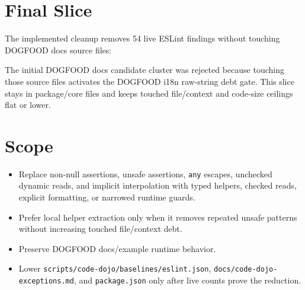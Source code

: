 \section{Final Slice}\label{record-224-final-slice}

The implemented cleanup removes 54 live ESLint findings without touching DOGFOOD docs source files:



The initial DOGFOOD docs candidate cluster was rejected because touching those source files activates the DOGFOOD i18n raw-string debt gate. This slice stays in package/core files and keeps touched file/context and code-size ceilings flat or lower.

\section{Scope}\label{record-224-scope}

\begin{itemize}
\tightlist
\item
  Replace non-null assertions, unsafe assertions, \texttt{a\allowbreak{}n\allowbreak{}y} escapes, unchecked dynamic reads, and implicit interpolation with typed helpers, checked reads, explicit formatting, or narrowed runtime guards.
\item
  Prefer local helper extraction only when it removes repeated unsafe patterns without increasing touched file/context debt.
\item
  Preserve DOGFOOD docs/example runtime behavior.
\item
  Lower \texttt{s\allowbreak{}c\allowbreak{}r\allowbreak{}i\allowbreak{}p\allowbreak{}t\allowbreak{}s\allowbreak{}/\allowbreak{}c\allowbreak{}o\allowbreak{}d\allowbreak{}e\allowbreak{}-\allowbreak{}d\allowbreak{}o\allowbreak{}j\allowbreak{}o\allowbreak{}/\allowbreak{}b\allowbreak{}a\allowbreak{}s\allowbreak{}e\allowbreak{}l\allowbreak{}i\allowbreak{}n\allowbreak{}e\allowbreak{}s\allowbreak{}/\allowbreak{}e\allowbreak{}s\allowbreak{}l\allowbreak{}i\allowbreak{}n\allowbreak{}t\allowbreak{}.\allowbreak{}j\allowbreak{}s\allowbreak{}o\allowbreak{}n}, \texttt{d\allowbreak{}o\allowbreak{}c\allowbreak{}s\allowbreak{}/\allowbreak{}c\allowbreak{}o\allowbreak{}d\allowbreak{}e\allowbreak{}-\allowbreak{}d\allowbreak{}o\allowbreak{}j\allowbreak{}o\allowbreak{}-\allowbreak{}e\allowbreak{}x\allowbreak{}c\allowbreak{}e\allowbreak{}p\allowbreak{}t\allowbreak{}i\allowbreak{}o\allowbreak{}n\allowbreak{}s\allowbreak{}.\allowbreak{}m\allowbreak{}d}, and \texttt{p\allowbreak{}a\allowbreak{}c\allowbreak{}k\allowbreak{}a\allowbreak{}g\allowbreak{}e\allowbreak{}.\allowbreak{}j\allowbreak{}s\allowbreak{}o\allowbreak{}n} only after live counts prove the reduction.
\end{itemize}

